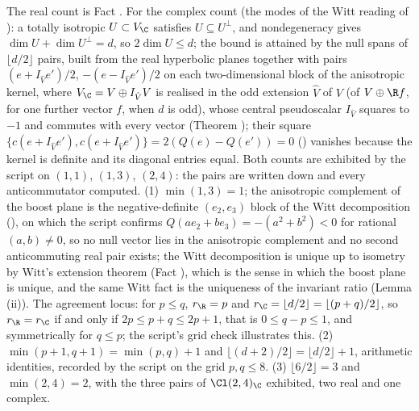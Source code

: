 The real count is Fact . For the complex count (the modes of the Witt reading of ): a totally isotropic $U \subset V_{\C}$ satisfies $U \subseteq U^{\perp}$, and nondegeneracy gives $\dim U + \dim U^{\perp} = d$, so $2\dim U \leq d$; the bound is attained by the null spans of $\lfloor d/2 \rfloor$ pairs, built from the real hyperbolic planes together with pairs $(e + I_{\hat V}e')/2$, $-(e - I_{\hat V}e')/2$ on each two-dimensional block of the anisotropic kernel, where $V_{\C} = V \oplus I_{\hat V}V$ is realised in the odd extension $\hat V$ of $V$ (of $V \oplus \R f$, for one further vector $f$, when $d$ is odd), whose central pseudoscalar $I_{\hat V}$ squares to $-1$ and commutes with every vector (Theorem ); their square $\{c(e+I_{\hat V}e'), c(e+I_{\hat V}e')\} = 2(Q(e) - Q(e')) = 0$ () vanishes because the kernel is definite and its diagonal entries equal. Both counts are exhibited by the script on $(1,1)$, $(1,3)$, $(2,4)$: the pairs are written down and every anticommutator computed. (1) $\min(1,3) = 1$; the anisotropic complement of the boost plane is the negative-definite $(e_{2}, e_{3})$ block of the Witt decomposition (), on which the script confirms $Q(ae_{2} + be_{3}) = -(a^{2} + b^{2}) < 0$ for rational $(a,b) \neq 0$, so no null vector lies in the anisotropic complement and no second anticommuting real pair exists; the Witt decomposition is unique up to isometry by Witt's extension theorem (Fact ), which is the sense in which the boost plane is unique, and the same Witt fact is the uniqueness of the invariant ratio (Lemma (ii)). The agreement locus: for $p \leq q$, $r_{\R} = p$ and $r_{\C} = \lfloor d/2 \rfloor = \lfloor (p+q)/2 \rfloor$, so $r_{\R} = r_{\C}$ if and only if $2p \leq p + q \leq 2p + 1$, that is $0 \leq q - p \leq 1$, and symmetrically for $q \leq p$; the script's grid check illustrates this. (2) $\min(p+1,q+1) = \min(p,q) + 1$ and $\lfloor (d+2)/2 \rfloor = \lfloor d/2 \rfloor + 1$, arithmetic identities, recorded by the script on the grid $p, q \leq 8$. (3) $\lfloor 6/2 \rfloor = 3$ and $\min(2,4) = 2$, with the three pairs of $\Cl(2,4)_{\C}$ exhibited, two real and one complex.
